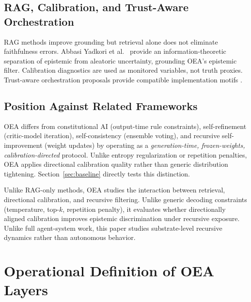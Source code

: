 \documentclass[11pt]{article}
\begin{document}
\subsection{RAG, Calibration, and Trust-Aware Orchestration}

RAG methods improve grounding \cite{lewis2020rag} but retrieval alone does not eliminate faithfulness errors. Abbasi Yadkori et al.~\cite{abbasiyadkori2024believe} provide an information-theoretic separation of epistemic from aleatoric uncertainty, grounding OEA's epistemic filter. Calibration diagnostics \cite{guo2017calibration} are used as monitored variables, not truth proxies. Trust-aware orchestration proposals provide compatible implementation motifs \cite{roumeliotis2025trust}.

\subsection{Position Against Related Frameworks}

OEA differs from constitutional AI (output-time rule constraints), self-refinement (critic-model iteration), self-consistency (ensemble voting), and recursive self-improvement (weight updates) by operating as a \emph{generation-time, frozen-weights, calibration-directed} protocol. Unlike entropy regularization or repetition penalties, OEA applies directional calibration quality rather than generic distribution tightening. Section~\ref{sec:baseline} directly tests this distinction.

Unlike RAG-only methods, OEA studies the interaction between retrieval, directional calibration, and recursive filtering. Unlike generic decoding constraints (temperature, top-$k$, repetition penalty), it evaluates whether directionally aligned calibration improves epistemic discrimination under recursive exposure. Unlike full agent-system work, this paper studies substrate-level recursive dynamics rather than autonomous behavior.

\section{Operational Definition of OEA Layers}
\label{sec:operational}
\end{document}
